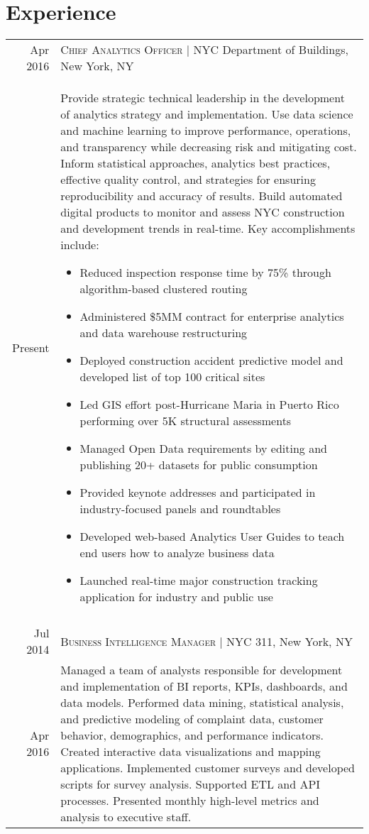 \documentclass[a4paper,10pt]{article}
\begin{document}
\section{Experience}
\begin{tabular}{r|p{13cm}}
 {Apr 2016} & \textsc{Chief Analytics Officer} | NYC Department of Buildings, New York, NY \\{Present}&\footnotesize{Provide strategic technical leadership in the development of analytics strategy and implementation. Use data science and machine learning to improve performance, operations, and transparency while decreasing risk and mitigating cost. Inform statistical approaches, analytics best practices, effective quality control, and strategies for ensuring reproducibility and accuracy of results. Build automated digital products to monitor and assess NYC construction and development trends in real-time. Key accomplishments include:}
 \begin{itemize}
		\item Reduced inspection response time by 75\% through algorithm-based clustered routing
		\item Administered \$5MM  contract for enterprise analytics and data warehouse restructuring
		\item Deployed construction accident predictive model and developed list of top 100 critical sites 
		\item Led GIS effort post-Hurricane Maria in Puerto Rico performing over 5K structural assessments
		\item Managed Open Data requirements by editing and publishing 20+ datasets for public consumption
		\item Provided keynote addresses and participated in industry-focused panels and roundtables
		\item Developed web-based Analytics User Guides to teach end users how to analyze business data
		\item Launched real-time major construction tracking application for industry and public use	
	\end{itemize}\vspace{-1.6em}\\\multicolumn{2}{c}{} \\{Jul 2014} & \textsc{Business Intelligence Manager} | NYC 311, New York, NY \\{Apr 2016}&\footnotesize{Managed a team of analysts responsible for development and implementation of BI reports, KPIs, dashboards, and data models. Performed data mining, statistical analysis, and predictive modeling of complaint data, customer behavior, demographics, and performance indicators. Created interactive data visualizations and mapping applications. Implemented customer surveys and developed scripts for survey analysis. Supported ETL and API processes. Presented monthly high-level metrics and analysis to executive staff.}

\end{tabular}
\end{document}
